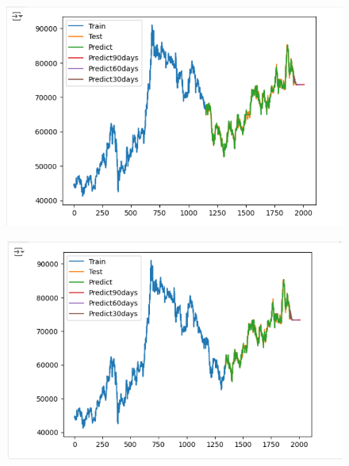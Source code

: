 \documentclass[conference]{IEEEtran}
\begin{document}
\begin{figure}[H]
    \centering
    \begin{minipage}{0.15\textwidth}
    \centering
    \includegraphics[width=1\textwidth]{Image/GradientBoosting/SAMSUNG_6_4_GradientBoostingRegressor.png}
   
    \label{fig:1}
    \end{minipage}%
    \begin{minipage}{0.15\textwidth}
    \centering
    \includegraphics[width=1\textwidth]{Image/GradientBoosting/SAMSUNG_7_3_GradientBoostingRegressor.png}
  

\end{minipage}
\end{figure}
\end{document}
